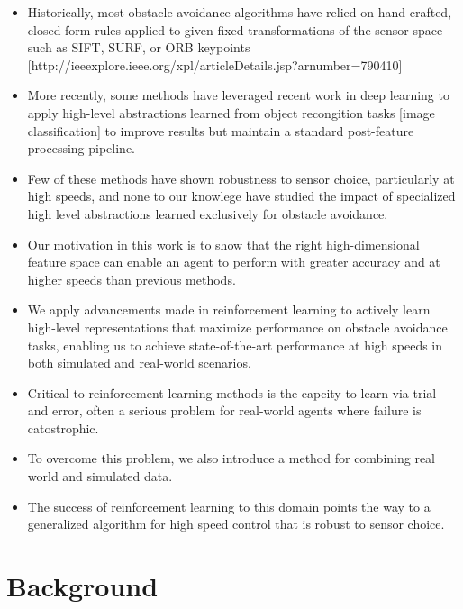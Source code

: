 \documentclass[paper=a4, fontsize=11pt]{scrartcl} %
\begin{document}
\begin{itemize}
	\item Historically, most obstacle avoidance algorithms have relied on hand-crafted, closed-form rules applied to given fixed transformations of the sensor space such as SIFT, SURF, or ORB keypoints [http://ieeexplore.ieee.org/xpl/articleDetails.jsp?arnumber=790410]
	\item More recently, some methods have leveraged recent work in deep learning to apply high-level abstractions learned from object recongition tasks [image classification] to improve results but maintain a standard post-feature processing pipeline.
	\item Few of these methods have shown robustness to sensor choice, particularly at high speeds, and none to our knowlege have studied the impact of specialized high level abstractions learned exclusively for obstacle avoidance.
\end{itemize}

\begin{itemize}	
	\item Our motivation in this work is to show that the right high-dimensional feature space can enable an agent to perform with greater accuracy and at higher speeds than previous methods.
	\item We apply advancements made in reinforcement learning to actively learn high-level representations that maximize performance on obstacle avoidance tasks, enabling us to achieve state-of-the-art performance at high speeds in both simulated and real-world scenarios. 
\end{itemize}

\begin{itemize}
	\item Critical to reinforcement learning methods is the capcity to learn via trial and error, often a serious problem for real-world agents where failure is catostrophic.
	\item To overcome this problem, we also introduce a method for combining real world and simulated data.
	\item The success of reinforcement learning to this domain points the way to a generalized algorithm for high speed control that is robust to sensor choice.
\end{itemize}

\section{Background}
\end{document}
